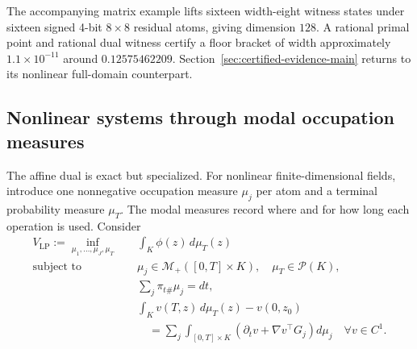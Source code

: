 \documentclass[twoside,11pt]{article}
\begin{document}
The accompanying matrix example lifts sixteen width-eight witness states under sixteen signed 4-bit $8\times8$ residual atoms, giving dimension $128$.  A rational primal point and rational dual witness certify a floor bracket of width approximately $1.1\times10^{-11}$ around $0.12575462209$.  Section~\ref{sec:certified-evidence-main} returns to its nonlinear full-domain counterpart.

\subsection{Nonlinear systems through modal occupation measures}
\label{sec:occupation-main}

The affine dual is exact but specialized.  For nonlinear finite-dimensional fields, introduce one nonnegative occupation measure $\mu_j$ per atom and a terminal probability measure $\mu_T$.  The modal measures record where and for how long each operation is used.  Consider
\begin{align}
 V_{\mathrm{LP}}:=\inf_{\mu_1,\ldots,\mu_J,\mu_T}
 &\quad\int_K\phi(z)\,d\mu_T(z)
 \label{eq:occupation-objective-main}\\
 \text{subject to }&\quad
 \mu_j\in\mathcal M_+([0,T]\times K),
 \quad\mu_T\in\mathcal P(K),\nonumber\\
 &\quad\sum_j\pi_{t\#}\mu_j=dt,
 \label{eq:occupation-time-marginal-main}\\
 &\quad
 \int_Kv(T,z)\,d\mu_T(z)-v(0,z_0)\nonumber\\
 &\qquad=
 \sum_j\int_{[0,T]\times K}
 \left(\partial_tv+\nabla v^\top G_j\right)d\mu_j
 \quad\forall v\in C^1.
 \label{eq:occupation-liouville-main}
\end{align}

\end{document}
